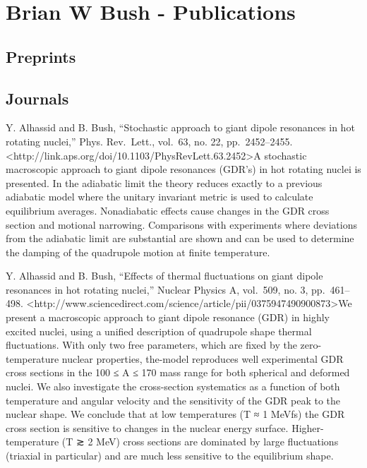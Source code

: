 \documentclass[]{article}
\begin{document}
\section{Brian W Bush - Publications}\label{brian-w-bush---publications}

\subsection{Preprints}\label{preprints}

\subsection{Journals}\label{journals}

Y. Alhassid and B. Bush, ``Stochastic approach to giant dipole
resonances in hot rotating nuclei,'' Phys. Rev.~Lett., vol.~63, no. 22,
pp.~2452--2455.
\textless{}http://link.aps.org/doi/10.1103/PhysRevLett.63.2452\textgreater{}A
stochastic macroscopic approach to giant dipole resonances (GDR's) in
hot rotating nuclei is presented. In the adiabatic limit the theory
reduces exactly to a previous adiabatic model where the unitary
invariant metric is used to calculate equilibrium averages. Nonadiabatic
effects cause changes in the GDR cross section and motional narrowing.
Comparisons with experiments where deviations from the adiabatic limit
are substantial are shown and can be used to determine the damping of
the quadrupole motion at finite temperature.

Y. Alhassid and B. Bush, ``Effects of thermal fluctuations on giant
dipole resonances in hot rotating nuclei,'' Nuclear Physics A, vol.~509,
no. 3, pp.~461--498.
\textless{}http://www.sciencedirect.com/science/article/pii/0375947490900873\textgreater{}We
present a macroscopic approach to giant dipole resonance (GDR) in highly
excited nuclei, using a unified description of quadrupole shape thermal
fluctuations. With only two free parameters, which are fixed by the
zero-temperature nuclear properties, the-model reproduces well
experimental GDR cross sections in the 100 ≤ A ≤ 170 mass range for both
spherical and deformed nuclei. We also investigate the cross-section
systematics as a function of both temperature and angular velocity and
the sensitivity of the GDR peak to the nuclear shape. We conclude that
at low temperatures (T ≈ 1 MeVfs) the GDR cross section is sensitive to
changes in the nuclear energy surface. Higher-temperature (T ≳ 2 MeV)
cross sections are dominated by large fluctuations (triaxial in
particular) and are much less sensitive to the equilibrium shape.
\end{document}
